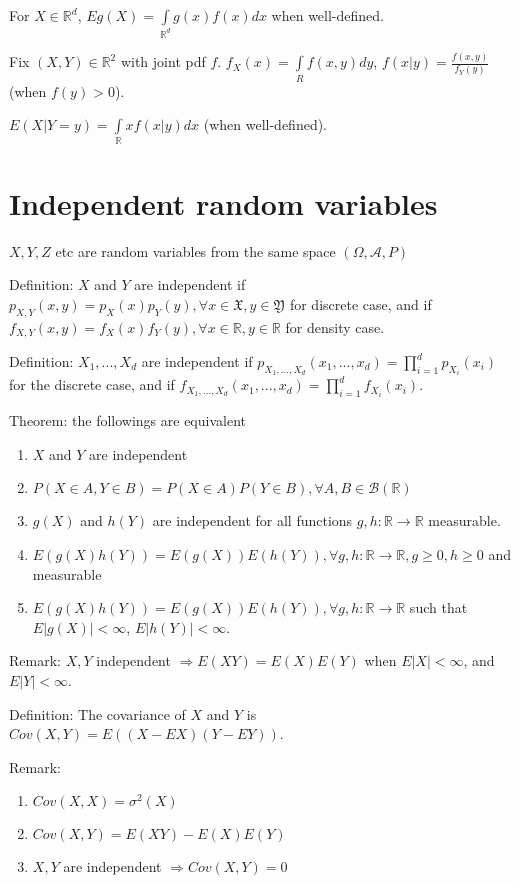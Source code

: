\documentclass[12pt]{article}
\newcommand{\A}{\mathcal{A}}
\newcommand{\B}{\mathcal{B}}
\begin{document}
For $X\in\mathbb{R}^d$, $Eg(X)=\int\limits_{\mathbb{R}^d}g(x)f(x)dx$ when well-defined.

Fix $(X,Y)\in\mathbb{R}^2$ with joint pdf $f$.
$f_X(x)=\int\limits_{R}f(x,y)dy$, $f(x|y)=\frac{f(x,y)}{f_Y(y)}$ (when $f(y)>0$).

$E(X|Y=y)=\int\limits_{\mathbb{R}}xf(x|y)dx$ (when well-defined).

\section{Independent random variables}

$X,Y,Z$ etc are random variables from the same space $(\Omega, \A, P)$

Definition: $X$ and $Y$ are independent if $p_{X,Y}(x,y)=p_X(x)p_Y(y),\forall x\in\mathfrak{X}, y\in\mathfrak{Y}$
for discrete case, and if $f_{X,Y}(x,y)=f_X(x)f_Y(y),\forall x\in\mathbb{R},y\in\mathbb{R}$ for density case.

Definition: $X_1,...,X_d$ are independent if $p_{X_1,...,X_d}(x_1,...,x_d)=\prod\limits_{i=1}^{d}p_{X_i}(x_i)$
for the discrete case, and if $f_{X_1,...,X_d}(x_1,...,x_d)=\prod\limits_{i=1}^{d}f_{X_i}(x_i)$.

Theorem: the followings are equivalent
\begin{enumerate}
    \item $X$ and $Y$ are independent
    \item $P(X\in A,Y\in B)=P(X\in A)P(Y\in B), \forall A,B\in\B(\mathbb{R})$
    \item $g(X)$ and $h(Y)$ are independent for all functions $g,h:\mathbb{R}\rightarrow\mathbb{R}$ measurable.
    \item $E(g(X)h(Y))=E(g(X))E(h(Y)),\forall g,h:\mathbb{R}\rightarrow\mathbb{R},g\ge 0, h\ge 0$ and measurable
    \item $E(g(X)h(Y))=E(g(X))E(h(Y)),\forall g,h:\mathbb{R}\rightarrow\mathbb{R}$ such that $E|g(X)|<\infty$, $E|h(Y)|<\infty$.
\end{enumerate}

Remark: $X,Y$ independent $\Rightarrow E(XY)=E(X)E(Y)$ when $E|X|<\infty$, and $E|Y|<\infty$.

Definition: The covariance of $X$ and $Y$ is
$Cov(X,Y)=E((X-EX)(Y-EY))$.

Remark:
\begin{enumerate}
    \item $Cov(X,X)=\sigma^2(X)$
    \item $Cov(X,Y)=E(XY)-E(X)E(Y)$
    \item $X,Y$ are independent $\Rightarrow Cov(X,Y)=0$
\end{enumerate}
\end{document}
